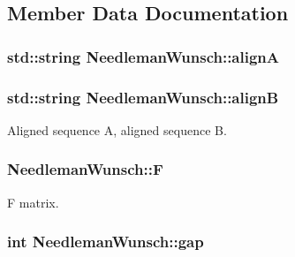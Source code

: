 \subsection{Member Data Documentation}
\hypertarget{class_needleman_wunsch_a0c94eb05cd5e7c47a9fdde9b5685ad9d}{
\subsubsection[{align\+A}]{\setlength{\rightskip}{0pt plus 5cm}std\+::string Needleman\+Wunsch\+::align\+A\hspace{0.3cm}{\ttfamily [private]}}}\label{class_needleman_wunsch_a0c94eb05cd5e7c47a9fdde9b5685ad9d}
\hypertarget{class_needleman_wunsch_ada9b7b807c02785439f0a85221352971}{
\subsubsection[{align\+B}]{\setlength{\rightskip}{0pt plus 5cm}std\+::string Needleman\+Wunsch\+::align\+B\hspace{0.3cm}{\ttfamily [private]}}}\label{class_needleman_wunsch_ada9b7b807c02785439f0a85221352971}


Aligned sequence A, aligned sequence B. 

\hypertarget{class_needleman_wunsch_a1084aa9b30f526dcf688fc4b39f8584d}{
\subsubsection[{F}]{ Needleman\+Wunsch\+::\+F\hspace{0.3cm}{\ttfamily [private]}}}\label{class_needleman_wunsch_a1084aa9b30f526dcf688fc4b39f8584d}


F matrix. 

\hypertarget{class_needleman_wunsch_ac66a16f7d4a66493f552a241109f1368}{
\subsubsection[{gap}]{\setlength{\rightskip}{0pt plus 5cm}int Needleman\+Wunsch\+::gap\hspace{0.3cm}{\ttfamily [private]}}}\label{class_needleman_wunsch_ac66a16f7d4a66493f552a241109f1368}


